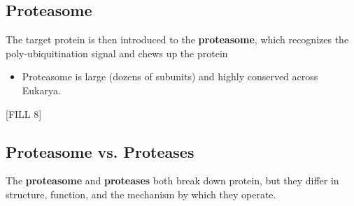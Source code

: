 \documentclass[10pt]{article}
\begin{document}
\subsection*{Proteasome}
The target protein is then introduced to the \textbf{proteasome}, which recognizes the poly-ubiquitination signal and chews up the protein
\begin{itemize}
    \item Proteasome is large (dozens of subunits) and highly conserved across Eukarya.
\end{itemize}
\begin{center}
    [FILL 8]
\end{center}

\subsection*{Proteasome vs. Proteases}
The \textbf{proteasome} and \textbf{proteases} both break down protein, but they differ in structure, function, and the mechanism by which they operate.
\end{document}
